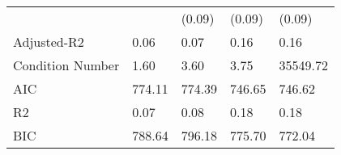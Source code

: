 \begin{table}
\begin{center}
\begin{tabular}{lllll}
                                               &         & (0.09)  & (0.09)  & (0.09)    \\
Adjusted-R2                                    & 0.06    & 0.07    & 0.16    & 0.16      \\
Condition Number                               & 1.60    & 3.60    & 3.75    & 35549.72  \\
AIC                                            & 774.11  & 774.39  & 746.65  & 746.62    \\
R2                                             & 0.07    & 0.08    & 0.18    & 0.18      \\
BIC                                            & 788.64  & 796.18  & 775.70  & 772.04    \\
\hline
\end{tabular}
\end{center}
\end{table}